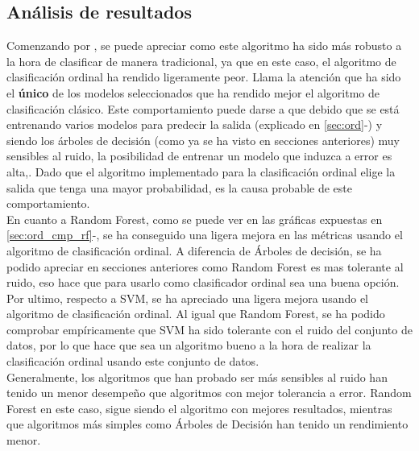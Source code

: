 \subsection{Análisis de resultados}
Comenzando por , se puede apreciar como este algoritmo ha sido más robusto a la hora de clasificar de manera tradicional, ya que en este caso, el algoritmo de clasificación ordinal ha rendido ligeramente peor. Llama la atención que ha sido el \textbf{único} de los modelos seleccionados que ha rendido mejor el algoritmo de clasificación clásico. Este comportamiento puede darse a que debido que se está entrenando varios modelos para predecir la salida (explicado en \ref{sec:ord}-) y siendo los árboles de decisión (como ya se ha visto en secciones anteriores) muy sensibles al ruido, la posibilidad de entrenar un modelo que induzca a error es alta,. Dado que el algoritmo implementado para la clasificación ordinal elige la salida que tenga una mayor probabilidad, es la causa probable de este comportamiento.\\
\linebreak
En cuanto a Random Forest, como se puede ver en las gráficas expuestas en \ref{sec:ord_cmp_rf}-, se ha conseguido una ligera mejora en las métricas usando el algoritmo de clasificación ordinal. A diferencia de Árboles de decisión, se ha podido apreciar en secciones anteriores como Random Forest es mas tolerante al ruido, eso hace que para usarlo como clasificador ordinal sea una buena opción.\\
\linebreak
Por ultimo, respecto a SVM, se ha apreciado una ligera mejora usando el algoritmo de clasificación ordinal. Al igual que Random Forest, se ha podido comprobar empíricamente que SVM ha sido tolerante con el ruido del conjunto de datos, por lo que hace que sea un algoritmo bueno a la hora de realizar la clasificación ordinal usando este conjunto de datos.\\
\linebreak
Generalmente, los algoritmos que han probado ser más sensibles al ruido han tenido un menor desempeño que algoritmos con mejor tolerancia a error. Random Forest en este caso, sigue siendo el algoritmo con mejores resultados, mientras que algoritmos más simples como Árboles de Decisión han tenido un rendimiento menor.
